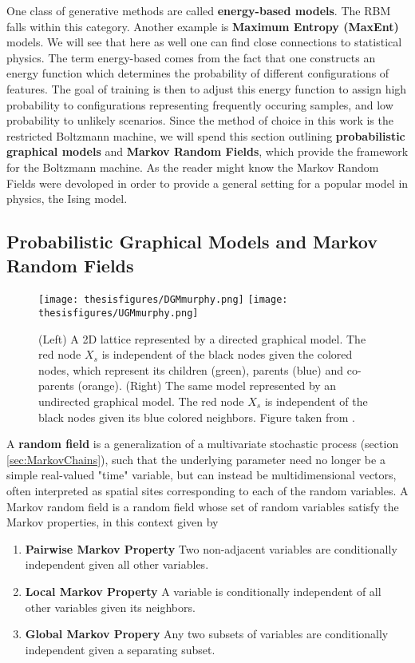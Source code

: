 \documentclass[twoside,english]{uiofysmaster}
\begin{document}
One class of generative methods are called \textbf{energy-based models}. The RBM falls within this category. Another example is \textbf{Maximum Entropy (MaxEnt)} models. We will see that here as well one can find close connections to statistical physics. The term energy-based comes from the fact that one constructs an energy function which determines the probability of different configurations of features. The goal of training is then to adjust this energy function to assign high probability to configurations representing frequently occuring samples, and low probability to unlikely scenarios. Since the method of choice in this work is the restricted Boltzmann machine, we will spend this section outlining \textbf{probabilistic graphical models} and \textbf{Markov Random Fields}, which provide the framework for the Boltzmann machine. As the reader might know the Markov Random Fields were devoloped in order to provide a general setting for a popular model in physics, the Ising model.




\subsection{Probabilistic Graphical Models and Markov Random Fields}
\label{sec:MRF}

\begin{figure}
\centering
 \texttt{[image: thesisfigures/DGMmurphy.png]}
 \texttt{[image: thesisfigures/UGMmurphy.png]}
 \caption{(Left) A 2D lattice represented by a directed graphical model. The red node $X_s$ is independent of the black nodes given the colored nodes, which represent its children (green), parents (blue) and co-parents (orange). (Right) The same model represented by an undirected graphical model. The red node $X_s$ is independent of the black nodes given its blue colored neighbors. Figure taken from \cite{Murphy2012}.}
 \label{fig:GMmurphy}
\end{figure}



A \textbf{random field} is a generalization of a multivariate stochastic process (section \ref{sec:MarkovChains}), such that the underlying parameter need no longer be a simple real-valued "time" variable, but can instead be multidimensional vectors, often interpreted as spatial sites corresponding to each of the random variables. A Markov random field is a random field whose set of random variables satisfy the Markov properties, in this context given by
\begin{enumerate}
	\item \textbf{Pairwise Markov Property} Two non-adjacent variables are conditionally independent given all other variables.
	\item \textbf{Local Markov Property} A variable is conditionally independent of all other variables given its neighbors.
	\item \textbf{Global Markov Propery} Any two subsets of variables are conditionally independent given a separating subset.
\end{enumerate}
\end{document}

